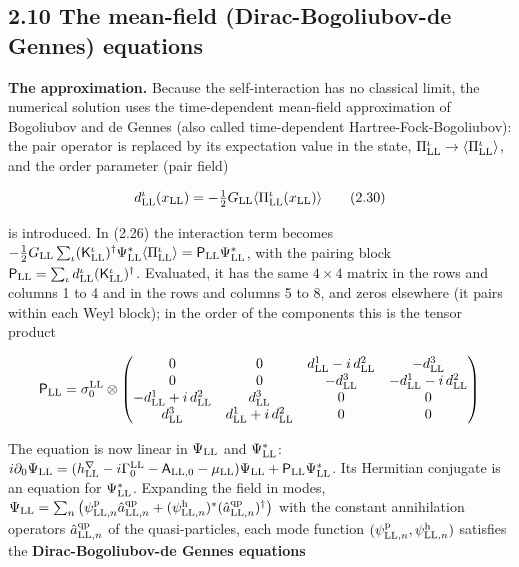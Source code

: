 \documentclass[
  10pt,
]{article}
\begin{document}
\hypertarget{the-mean-field-dirac-bogoliubov-de-gennes-equations}{%
\subsection{2.10 The mean-field (Dirac-Bogoliubov-de Gennes)
equations}\label{the-mean-field-dirac-bogoliubov-de-gennes-equations}}

\textbf{The approximation.} Because the self-interaction has no
classical limit, the numerical solution uses the time-dependent
mean-field approximation of Bogoliubov and de Gennes (also called
time-dependent Hartree-Fock-Bogoliubov): the pair operator is replaced
by its expectation value in the state,
\(\Pi^\iota_{\rm LL}\to\langle\Pi^\iota_{\rm LL}\rangle\), and the order
parameter (pair field)

\[d^\iota_{\rm LL}(x_{\rm LL})=-\tfrac12G_{\rm LL}\langle\Pi^\iota_{\rm LL}(x_{\rm LL})\rangle\tag{2.30}\]

is introduced. In (2.26) the interaction term becomes
\(-\tfrac12G_{\rm LL}\sum_\iota(\mathsf K^\iota_{\rm LL})^\dagger\Psi^*_{\rm LL}\langle\Pi^\iota_{\rm LL}\rangle=\mathsf P_{\rm LL}\Psi^*_{\rm LL}\),
with the pairing block
\(\mathsf P_{\rm LL}=\sum_\iota d^\iota_{\rm LL}(\mathsf K^\iota_{\rm LL})^\dagger\).
Evaluated, it has the same \(4\times4\) matrix in the rows and columns 1
to 4 and in the rows and columns 5 to 8, and zeros elsewhere (it pairs
within each Weyl block); in the order of the components this is the
tensor product

\[\mathsf P_{\rm LL}=\sigma^{\rm LL}_0\otimes\begin{pmatrix}0&0&d^{1}_{\rm LL}-i\,d^{2}_{\rm LL}&-d^{3}_{\rm LL}\\0&0&-d^{3}_{\rm LL}&-d^{1}_{\rm LL}-i\,d^{2}_{\rm LL}\\-d^{1}_{\rm LL}+i\,d^{2}_{\rm LL}&d^{3}_{\rm LL}&0&0\\d^{3}_{\rm LL}&d^{1}_{\rm LL}+i\,d^{2}_{\rm LL}&0&0\end{pmatrix}\]

The equation is now linear in \(\Psi_{\rm LL}\) and \(\Psi^*_{\rm LL}\):
\(i\partial_0\Psi_{\rm LL}=(h^\nabla_{\rm LL}-i\Gamma^{\rm LL}_0-\mathsf A_{{\rm LL},0}-\mu_{\rm LL})\Psi_{\rm LL}+\mathsf P_{\rm LL}\Psi^*_{\rm LL}\).
Its Hermitian conjugate is an equation for \(\Psi^*_{\rm LL}\).
Expanding the field in modes,
\(\Psi_{\rm LL}=\sum_n\big(\psi^{\rm p}_{{\rm LL},n}\hat a^{\rm qp}_{{\rm LL},n}+(\psi^{\rm h}_{{\rm LL},n})^*(\hat a^{\rm qp}_{{\rm LL},n})^\dagger\big)\)
with the constant annihilation operators
\(\hat a^{\rm qp}_{{\rm LL},n}\) of the quasi-particles, each mode
function \((\psi^{\rm p}_{{\rm LL},n},\psi^{\rm h}_{{\rm LL},n})\)
satisfies the \textbf{Dirac-Bogoliubov-de Gennes equations}
\end{document}
